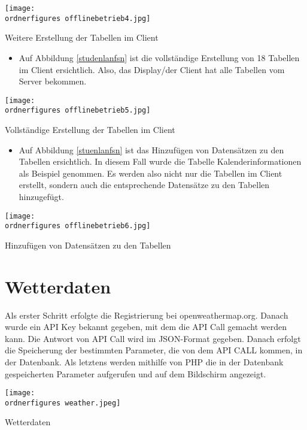 \begin{center}
	\captionsetup{type=figure}
	\texttt{[image: \\ordnerfigures offlinebetrieb4.jpg]}
	\caption{Weitere Erstellung der Tabellen im Client}
	\label{studenplanfsn} 
\end{center}
\begin{itemize}
	\item Auf Abbildung \ref{studenlanfsn} ist die vollst\"andige Erstellung von 18 Tabellen im Client ersichtlich. Also, das Display/der Client hat alle Tabellen vom Server bekommen.
\end{itemize}
\begin{center}
	\captionsetup{type=figure}
	\texttt{[image: \\ordnerfigures offlinebetrieb5.jpg]}
	\caption{Vollst\"andige Erstellung der Tabellen im Client}
	\label{studenlanfsn} 
\end{center}
\begin{itemize}
	\item Auf Abbildung \ref{stuenlanfsn} ist das Hinzuf\"ugen von Datens\"atzen zu den Tabellen ersichtlich. In diesem Fall wurde die Tabelle Kalenderinformationen als Beispiel genommen. Es werden also nicht nur die Tabellen im Client erstellt, sondern auch die entsprechende Datens\"atze zu den Tabellen hinzugef\"ugt.
\end{itemize}
\begin{center}
	\captionsetup{type=figure}
	\texttt{[image: \\ordnerfigures offlinebetrieb6.jpg]}
	\caption{Hinzuf\"ugen von Datens\"atzen zu den Tabellen}
	\label{stuenlanfsn} 
\end{center}
\section{Wetterdaten}

Als erster Schritt erfolgte die Registrierung bei openweathermap.org. Danach wurde ein API Key bekannt gegeben, mit dem die API Call gemacht werden kann. Die Antwort von API Call wird im JSON-Format gegeben.
Danach erfolgt die Speicherung der bestimmten Parameter, die von dem API CALL kommen, in der Datenbank.
Als letztens werden mithilfe von PHP die in der Datenbank gespeicherten Parameter aufgerufen und auf dem Bildschirm angezeigt. 
\begin{center}
	\captionsetup{type=figure}
	\texttt{[image: \\ordnerfigures weather.jpeg]}
	\caption{Wetterdaten}
	\label{Wetter} 
	\captionsetup{type=figure} 
\end{center}	
